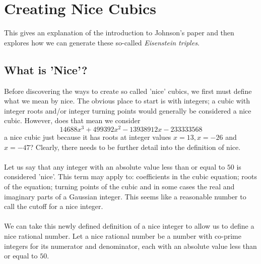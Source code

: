 \documentclass[12pt]{article}
\begin{document}
\pagebreak 

\section{Creating Nice Cubics}
This gives an explanation of the introduction to Johnson's paper and then explores how we can generate these so-called \textit{Eisenstein triples}.

\subsection{What is 'Nice'?}
Before discovering the ways to create so called 'nice' cubics, we first must define what we mean by nice. The obvious place to start is with integers; a cubic with integer roots and/or integer turning points would generally be considered a nice cubic. However, does that mean we consider $$14688x^3+499392x^2-13938912x-233333568$$ a nice cubic just because it has roots at integer values $x=13, x=-26$ and $x=-47$? Clearly, there needs to be further detail into the definition of nice.\\\\
Let us say that any integer with an absolute value less than or equal to $50$ is considered 'nice'. This term may apply to: coefficients in the cubic equation; roots of the equation; turning points of the cubic and in some cases the real and imaginary parts of a Gaussian integer. This seems like a reasonable number to call the cutoff for a nice integer.\\\\
We can take this newly defined definition of a nice integer to allow us to define a nice rational number. Let a nice rational number be a number with co-prime integers for its numerator and denominator, each with an absolute value less than or equal to $50$.
\end{document}
